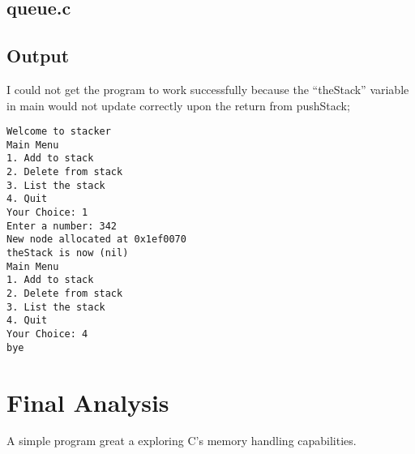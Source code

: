 \documentclass[letterpaper,oneside]{scrartcl}
\begin{document}
\subsection{queue.c}

\subsection{Output}
I could not get the program to work successfully because the ``theStack'' variable in main
would not update correctly upon the return from pushStack;

\begin{Verbatim}
Welcome to stacker
Main Menu
1. Add to stack
2. Delete from stack
3. List the stack
4. Quit
Your Choice: 1
Enter a number: 342
New node allocated at 0x1ef0070
theStack is now (nil)
Main Menu
1. Add to stack
2. Delete from stack
3. List the stack
4. Quit
Your Choice: 4
bye
\end{Verbatim}

\section{Final Analysis}

A simple program great a exploring C's memory handling capabilities.
\end{document}

